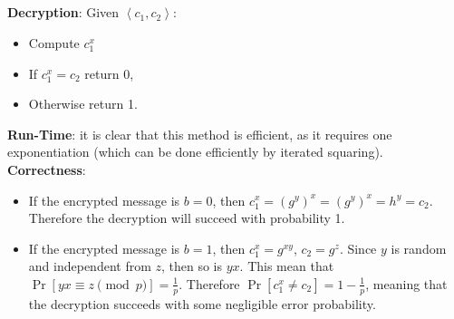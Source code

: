 \documentclass{article}
\begin{document}
\subsection{} %
\textbf{Decryption}: Given $ \left<c_1, c_2\right> $:
\begin{itemize}
\item Compute $ c_1^x $
\item If $ c_1^x = c_2 $ return 0,
\item Otherwise return 1.
\end{itemize}
\textbf{Run-Time}: it is clear that this method is efficient, as it requires one exponentiation (which can be done efficiently by iterated squaring). \\
\textbf{Correctness}:
\begin{itemize}
\item  If the encrypted message is $ b = 0 $, then $ c_1^x = \left(g^y\right)^x = \left(g^y\right)^x = h^y = c_2 $. Therefore the decryption will succeed with probability 1.
\item If the encrypted message is $ b = 1 $, then $ c_1^x = g^{xy} $, $ c_2 =g^z $. Since $ y $ is random and independent from $ z $, then so is $ yx $. This mean that $ \Pr[yx \equiv z \pmod{p}] = \frac{1}{p} $. Therefore $ \Pr[c_1^x \neq c_2] = 1 - \frac{1}{p} $, meaning that the decryption succeeds with some negligible error probability.
\end{itemize}

\subsection{} %
\end{document}
